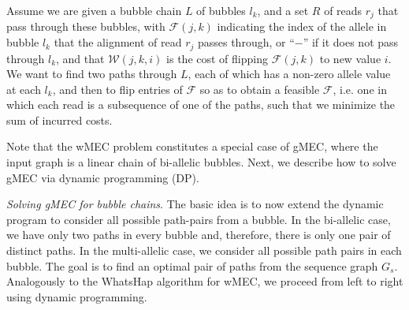 % 

\begin{problem}
Assume we are given a bubble chain $L$ of bubbles $l_k$, and a set $R$ of reads $r_j$ that pass through these bubbles, with $\mathcal{F}(j,k)$ indicating the index of the allele in bubble $l_k$ that the alignment of read $r_j$ passes through, or ``$-$'' if it does not pass through $l_k$, and that $\mathcal{W}(j,k,i)$ is the cost of flipping $\mathcal{F}(j,k)$ to new value $i$.  
We want to find two paths through $L$, each of which has a non-zero allele value at each $l_k$, and then to flip entries of $\mathcal{F}$ so as to obtain a feasible $\mathcal{F}$, 
i.e. one in which each read is a subsequence of one of the paths, such that we minimize the sum of incurred costs.
\end{problem}
Note that the wMEC problem constitutes a special case of gMEC, where the input graph is a linear chain of bi-allelic bubbles.
Next, we describe how to solve gMEC via dynamic programming (DP).

\textit{Solving gMEC for bubble chains}. The basic idea is to now extend the dynamic program to consider all possible path-pairs from a bubble. 
In the bi-allelic case, we have only two paths in every bubble and, therefore, there is only one pair of distinct paths.
In the multi-allelic case, we consider all possible path pairs in each bubble.
The goal is to find an optimal pair of paths from the sequence graph $G_s$.
Analogously to the WhatsHap algorithm for wMEC, we proceed from left to right using dynamic programming.  

